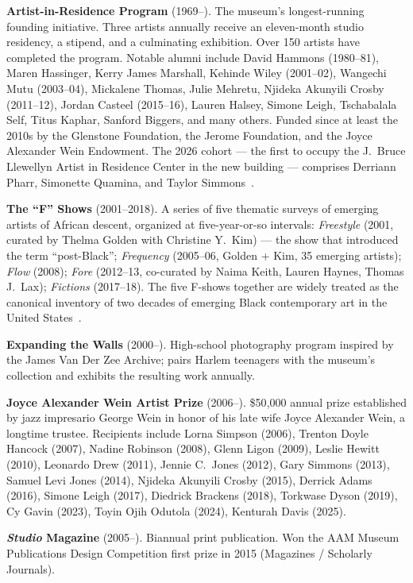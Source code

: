 \documentclass[10pt,letterpaper,twocolumn]{article}
\begin{document}
\textbf{Artist-in-Residence Program} (1969--). The museum's longest-running founding initiative. Three artists annually receive an eleven-month studio residency, a stipend, and a culminating exhibition. Over 150 artists have completed the program. Notable alumni include David Hammons (1980--81), Maren Hassinger, Kerry James Marshall, Kehinde Wiley (2001--02), Wangechi Mutu (2003--04), Mickalene Thomas, Julie Mehretu, Njideka Akunyili Crosby (2011--12), Jordan Casteel (2015--16), Lauren Halsey, Simone Leigh, Tschabalala Self, Titus Kaphar, Sanford Biggers, and many others. Funded since at least the 2010s by the Glenstone Foundation, the Jerome Foundation, and the Joyce Alexander Wein Endowment. The 2026 cohort --- the first to occupy the J.~Bruce Llewellyn Artist in Residence Center in the new building --- comprises Derriann Pharr, Simonette Quamina, and Taylor Simmons~\citep{smh2026air}.

\textbf{The ``F'' Shows} (2001--2018). A series of five thematic surveys of emerging artists of African descent, organized at five-year-or-so intervals: \emph{Freestyle} (2001, curated by Thelma Golden with Christine Y.~Kim) --- the show that introduced the term ``post-Black''; \emph{Frequency} (2005--06, Golden + Kim, 35 emerging artists); \emph{Flow} (2008); \emph{Fore} (2012--13, co-curated by Naima Keith, Lauren Haynes, Thomas J.~Lax); \emph{Fictions} (2017--18). The five F-shows together are widely treated as the canonical inventory of two decades of emerging Black contemporary art in the United States~\citep{artsy2017fictions}.

\textbf{Expanding the Walls} (2000--). High-school photography program inspired by the James Van Der Zee Archive; pairs Harlem teenagers with the museum's collection and exhibits the resulting work annually.

\textbf{Joyce Alexander Wein Artist Prize} (2006--). \$50{,}000 annual prize established by jazz impresario George Wein in honor of his late wife Joyce Alexander Wein, a longtime trustee. Recipients include Lorna Simpson (2006), Trenton Doyle Hancock (2007), Nadine Robinson (2008), Glenn Ligon (2009), Leslie Hewitt (2010), Leonardo Drew (2011), Jennie C.~Jones (2012), Gary Simmons (2013), Samuel Levi Jones (2014), Njideka Akunyili Crosby (2015), Derrick Adams (2016), Simone Leigh (2017), Diedrick Brackens (2018), Torkwase Dyson (2019), Cy Gavin (2023), Toyin Ojih Odutola (2024), Kenturah Davis (2025).

\textbf{\emph{Studio} Magazine} (2005--). Biannual print publication. Won the AAM Museum Publications Design Competition first prize in 2015 (Magazines / Scholarly Journals).
\end{document}
